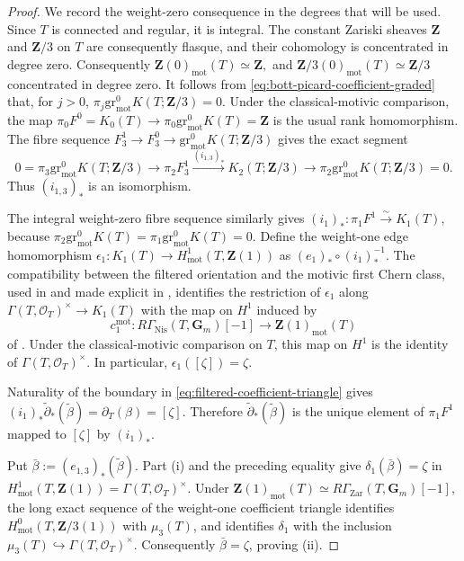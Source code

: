 \documentclass[10pt]{amsart}
\newcommand{\gr}{\mathrm{gr}}
\newcommand{\mot}{\operatorname{mot}}
\theoremstyle{remark}
\begin{document}
\begin{proof}
	We record the weight-zero consequence in the degrees that will be used.
	Since \(T\) is connected and regular, it is integral. The
	constant Zariski sheaves \(\mathbf Z\) and \(\mathbf Z/3\) on \(T\)
	are consequently flasque, and their cohomology is concentrated in degree
	zero. 
	Consequently
	\(
	\mathbf Z(0)_{\mot}(T)\simeq\mathbf Z,
	\) and \(
	\mathbf Z/3(0)_{\mot}(T)\simeq\mathbf Z/3
	\)
	concentrated in degree zero. It follows from
	\eqref{eq:bott-picard-coefficient-graded} that, for \(j>0\), \(
	\pi_j\gr^0_{\mot}K(T;\mathbf Z/3)=0
	.
	\)
	Under the classical-motivic comparison, the map
	\(
	\pi_0F^0=K_0(T)\to\pi_0\gr^0_{\mot}K(T)=\mathbf Z
	\)
	is the usual
	rank homomorphism. The fibre sequence \(F^1_3\to F^0_3\to
	\gr^0_{\mot}K(T;\mathbf Z/3)\) gives the exact segment
	\[
	0=\pi_3\gr^0_{\mot}K(T;\mathbf Z/3)\to
	\pi_2F^1_3\xrightarrow{(i_{1,3})_*}K_2(T;\mathbf Z/3)\to
	\pi_2\gr^0_{\mot}K(T;\mathbf Z/3)=0.
	\] 
	Thus \((i_{1,3})_*\) is an isomorphism.
	
	The integral weight-zero fibre sequence similarly gives
	\((i_1)_*\colon\pi_1F^1\xrightarrow{\sim}K_1(T)\), because
	\(\pi_2\gr^0_{\mot}K(T)=\pi_1\gr^0_{\mot}K(T)=0\). Define the
	weight-one edge homomorphism
	\(\epsilon_1\colon K_1(T)\to H^1_{\mot}(T,\mathbf Z(1))\) as
	\((e_1)_*\circ(i_1)_*^{-1}\). The compatibility between the filtered
	orientation and the motivic first Chern class, used in
	\cite[Rem.~4.4]{BouisWeibelVanishingPBF} and made explicit in
	\cite[\S4.1]{ElmantoMorrowEquicharMotivic}, identifies the restriction of
	\(\epsilon_1\) along
	\(\Gamma(T,\mathcal O_T)^\times\to K_1(T)\) with the map on \(H^1\)
	induced by
	\[
	c_1^{\mot}\colon
	R\Gamma_{\mathrm{Nis}}(T,\mathbf G_m)[-1]\longrightarrow
	\mathbf Z(1)_{\mot}(T)
	\]
	of \cite[Def.~4.1 and Rem.~4.2]{BouisWeibelVanishingPBF}. Under the
	classical-motivic comparison on \(T\), this map on \(H^1\) is the
	identity of \(\Gamma(T,\mathcal O_T)^\times\). In particular,
	\(\epsilon_1([\zeta])=\zeta\).
	
	Naturality of the boundary in
	\eqref{eq:filtered-coefficient-triangle} gives
	\((i_1)_*\widetilde\partial_*(\widetilde\beta)
	=\partial_T(\beta)=[\zeta]\). Therefore
	\(\widetilde\partial_*(\widetilde\beta)\) is the unique element of
	\(\pi_1F^1\) mapped to \([\zeta]\) by \((i_1)_*\).
	
	Put \(\bar\beta:=(e_{1,3})_*(\widetilde\beta)\). Part \textup{(i)}
	and the preceding equality give
	\(\delta_1(\bar\beta)=\zeta\) in
	\(H^1_{\mot}(T,\mathbf Z(1))=\Gamma(T,\mathcal O_T)^\times\).
	Under \(\mathbf Z(1)_{\mot}(T)\simeq
	R\Gamma_{\mathrm{Zar}}(T,\mathbf G_m)[-1]\), the long exact sequence
	of the weight-one coefficient triangle identifies
	\(H^0_{\mot}(T,\mathbf Z/3(1))\) with \(\mu_3(T)\), and identifies
	\(\delta_1\) with the inclusion
	\(\mu_3(T)\hookrightarrow\Gamma(T,\mathcal O_T)^\times\).
	Consequently \(\bar\beta=\zeta\), proving \textup{(ii)}.
	

\end{proof}
\end{document}
